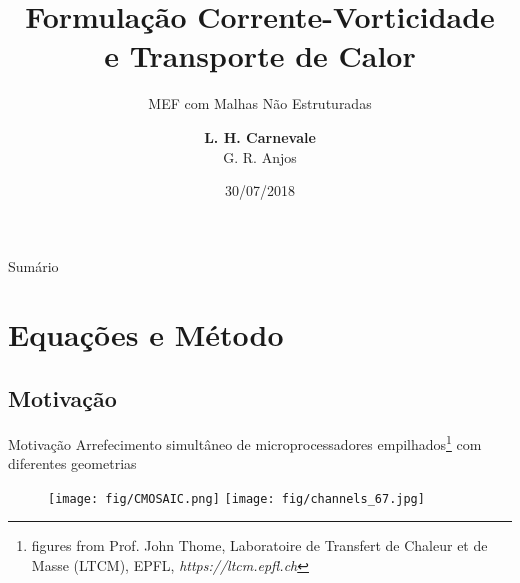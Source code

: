 \documentclass{beamer}
\title{Formulação Corrente-Vorticidade \\ e Transporte de Calor}
\subtitle{MEF com Malhas Não Estruturadas}
\author{\textbf{L. H. Carnevale} \\ G. R. Anjos}
\date{30/07/2018}
\begin{document}
    \begin{frame}
        \maketitle
    \end{frame}
    
    
    \begin{frame}{Sumário}
		\tableofcontents
	\end{frame}
    
    
	\section{Equações e Método}	
	\subsection{Motivação}	
	\begin{frame}{Motivação}
		  Arrefecimento simultâneo de microprocessadores empilhados\footnote{figures from Prof. John Thome, Laboratoire de Transfert de Chaleur et de Masse (LTCM), EPFL, \textit{https://ltcm.epfl.ch}} com diferentes geometrias
        \begin{figure}
        	\texttt{[image: fig/CMOSAIC.png]}
        	\texttt{[image: fig/channels\_67.jpg]}
        \end{figure}
    \end{frame}

\end{document}
